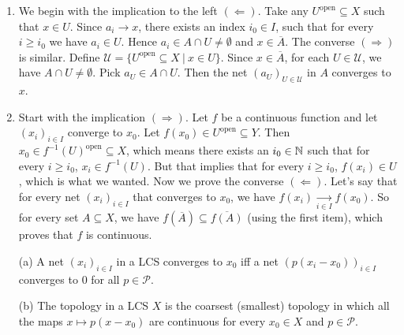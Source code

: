 \begin{myproof}
  \begin{enumerate}
    \item We begin with the implication to the left $(\Leftarrow)$.
    Take any $U^{\textrm{open}} \subseteq X$ such that $x \in U$. Since $a_i \to x$, there exists an index $i_0 \in I$,
    such that for every $i \geq i_0$ we have $a_i \in U$. Hence $a_i \in A \cap U \neq \emptyset$ and $x \in \overline{A}$.
    The converse $(\Rightarrow)$ is similar. Define $\mathcal{U} = \{U^{\textrm{open}} \subseteq X\ |\ x \in U\}$.
    Since $x \in \overline{A}$, for each $U \in \mathcal{U}$, we have $A \cap U \neq \emptyset$.
    Pick $a_U \in A \cap U$. Then the net $(a_U)_{U \in \mathcal{U}}$ in $A$ converges to $x$.
    \item Start with the implication $(\Rightarrow)$. Let $f$ be a continuous function and let $(x_i)_{i \in I}$ converge to $x_0$.
    Let $f(x_0) \in U^{\textrm{open}} \subseteq Y$. Then $x_0 \in f^{-1} (U) ^{\textrm{open}} \subseteq X$, which means there exists an $i_0 \in \mathbb {N}$ 
    such that for every $i \geq i_0$, $x_i \in f^{-1} (U)$. But that implies that for every $i \geq i_0$, $f(x_i) \in U$, which is what we wanted.
    Now we prove the converse $(\Leftarrow)$. Let's say that for every net $(x_i)_{i \in I}$ that converges to $x_0$, we have $f(x_i) \xrightarrow[i \in I]{} f(x_0)$.
    So for every set $A \subseteq X$, we have $f(\overline{A}) \subseteq \overline{f(A)}$ (using the first item),
    which proves that $f$ is continuous. \qedhere
  \end{enumerate}
\end{myproof}

\begin{proposition}
    \begin{itemize}
        \item[(a)] A net $(x_i)_{i \in I}$ in a LCS converges to $x_0$ iff a net $(p(x_i - x_0))_{i \in I}$ converges to $0$ for all $p \in \mathcal{P}$.
        \item[(b)] The topology in a LCS $X$ is the coarsest (smallest) topology in which all the maps 
        $x \mapsto p(x - x_0)$ are continuous for every $x_0 \in X$ and $p \in \mathcal{P}$.
    \end{itemize}
\end{proposition}


